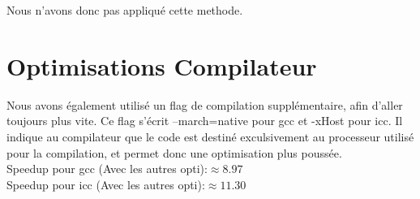 Nous n'avons donc pas appliqué cette methode.

\section*{Optimisations Compilateur}

Nous avons également utilisé un flag de compilation supplémentaire, afin d'aller toujours plus vite.
Ce flag s'écrit --march=native pour gcc et -xHost pour icc. Il indique au compilateur que le code est destiné exculsivement au processeur utilisé pour la compilation, et permet donc une optimisation plus poussée.\\

Speedup pour gcc (Avec les autres opti):$\approx 8.97$\\
Speedup pour icc (Avec les autres opti):$\approx 11.30$\\



